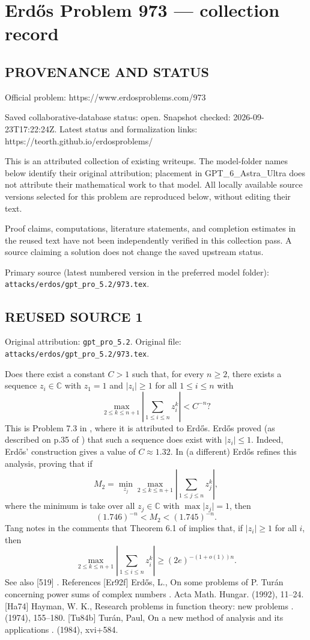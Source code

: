 \section*{Erd\H{o}s Problem 973 --- collection record}

\subsection*{PROVENANCE AND STATUS}
Official problem: https://www.erdosproblems.com/973

Saved collaborative-database status: open.
Snapshot checked: 2026-09-23T17:22:24Z.
Latest status and formalization links: https://teorth.github.io/erdosproblems/

This is an attributed collection of existing writeups. The model-folder names below identify their original attribution; placement in GPT\_6\_Astra\_Ultra does not attribute their mathematical work to that model. All locally available source versions selected for this problem are reproduced below, without editing their text.

Proof claims, computations, literature statements, and completion estimates in the reused text have not been independently verified in this collection pass. A source claiming a solution does not change the saved upstream status.

Primary source (latest numbered version in the preferred model folder): \texttt{attacks/erdos/gpt\_pro\_5.2/973.tex}.

\subsection*{REUSED SOURCE 1}
Original attribution: \texttt{gpt\_pro\_5.2}.
Original file: \texttt{attacks/erdos/gpt\_pro\_5.2/973.tex}.


Does there exist a constant $C>1$ such that, for every $n\geq 2$, there exists a sequence $z_i\in \mathbb{C}$ with $z_1=1$ and $\lvert z_i\rvert \geq 1$ for all $1\leq i\leq n$ with\[\max_{2\leq k\leq n+1}\left\lvert \sum_{1\leq i\leq n}z_i^k\right\rvert < C^{-n}?\] This is Problem 7.3 in \cite{Ha74}, where it is attributed to Erd\H{o}s. Erd\H{o}s proved (as described on p.35 of \cite{Tu84b}) that such a sequence does exist with $\lvert z_i\rvert\leq 1$. Indeed, Erd\H{o}s' construction gives a value of $C\approx 1.32$. In \cite{Er92f} (a different) Erd\H{o}s refines this analysis, proving that if\[M_2=\min_{z_j} \max_{2\leq k\leq n+1} \left\lvert \sum_{1\leq j\leq n}z_j^k\right\rvert,\]where the minimum is take over all $z_j\in \mathbb{C}$ with $\max \lvert z_j\rvert=1$, then\[(1.746)^{-n} < M_2 < (1.745)^{-n}.\]Tang notes in the comments that Theorem 6.1 of \cite{Tu84b} implies that, if $\lvert z_i\rvert \geq 1$ for all $i$, then\[\max_{2\leq k\leq n+1}\left\lvert \sum_{1\leq i\leq n}z_i^k\right\rvert \geq (2e)^{-(1+o(1))n}.\]See also [519] . References [Er92f] Erd\H{o}s, L., On some problems of {P}. {T}ur\'an concerning power sums of complex numbers . Acta Math. Hungar. (1992), 11--24. [Ha74] Hayman, W. K., Research problems in function theory: new problems . (1974), 155--180. [Tu84b] Tur\'an, Paul, On a new method of analysis and its applications . (1984), xvi+584.


